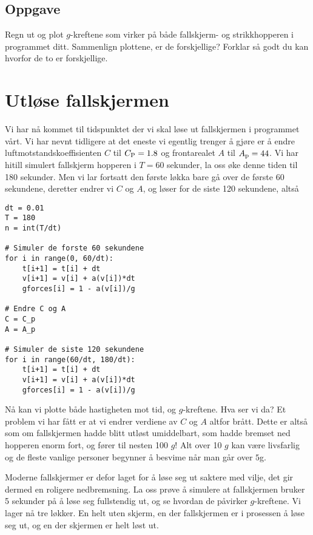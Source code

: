 \documentclass[a4paper, 11pt, notitlepage, english]{article}
\begin{document}
\subsection*{Oppgave}
Regn ut og plot $g$-kreftene som virker på både fallskjerm- og strikkhopperen i programmet ditt. Sammenlign plottene, er de forskjellige? Forklar så godt du kan hvorfor de to er forskjellige.

\clearpage

\section*{Utløse fallskjermen}
Vi har nå kommet til tidspunktet der vi skal løse ut fallskjermen i programmet vårt. Vi har nevnt tidligere at det eneste vi egentlig trenger å gjøre er å endre luftmotstandskoeffisienten $C$ til $C_{\rm P} = 1.8$ og frontarealet $A$ til $A_{\rm p} = 44$. Vi har hitill simulert fallskjerm hopperen i $T=60$ sekunder, la oss øke denne tiden til 180 sekunder. Men vi lar fortsatt den første løkka bare gå over de første 60 sekundene, deretter endrer vi $C$ og $A$, og løser for de siste 120 sekundene, altså
\begin{lstlisting}
dt = 0.01
T = 180
n = int(T/dt)

# Simuler de forste 60 sekundene
for i in range(0, 60/dt):
    t[i+1] = t[i] + dt
    v[i+1] = v[i] + a(v[i])*dt
    gforces[i] = 1 - a(v[i])/g

# Endre C og A
C = C_p
A = A_p

# Simuler de siste 120 sekundene
for i in range(60/dt, 180/dt):
    t[i+1] = t[i] + dt
    v[i+1] = v[i] + a(v[i])*dt
    gforces[i] = 1 - a(v[i])/g
\end{lstlisting}

Nå kan vi plotte både hastigheten mot tid, og $g$-kreftene. Hva ser vi da? Et problem vi har fått er at vi endrer verdiene av $C$ og $A$ altfor brått. Dette er altså som om fallskjermen hadde blitt utløst umiddelbart, som hadde bremset ned hopperen enorm fort, og fører til nesten 100 $g$! Alt over 10 $g$ kan være livsfarlig og de fleste vanlige personer begynner å besvime når man går over $5$g.

Moderne fallskjermer er defor laget for å løse seg ut saktere med vilje, det gir dermed en roligere nedbremsning. La oss prøve å simulere at fallskjermen bruker 5 sekunder på å løse seg fullstendig ut, og se hvordan de påvirker $g$-kreftene. Vi lager nå tre løkker. En helt uten skjerm, en der fallskjermen er i prosessen å løse seg ut, og en der skjermen er helt løst ut.
\end{document}
